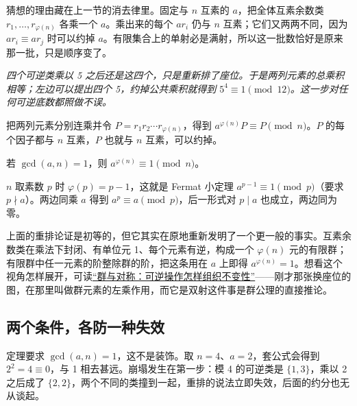 猜想的理由藏在上一节的消去律里。固定与 \(n\) 互素的 \(a\)，把全体互素余数类 \(r_1,\dots,r_{\varphi(n)}\) 各乘一个 \(a\)。乘出来的每个 \(ar_i\) 仍与 \(n\) 互素；它们又两两不同，因为 \(ar_i\equiv ar_j\) 时可以约掉 \(a\)。有限集合上的单射必是满射，所以这一批数恰好是原来那一批，只是顺序变了。

\begin{center}

\emph{四个可逆类乘以 5 之后还是这四个，只是重新排了座位。于是两列元素的总乘积相等；左边可以提出四个 5，约掉公共乘积就得到 \(5^{4}\equiv1\pmod{12}\)。这一步对任何可逆底数都照做不误。}
\end{center}

把两列元素分别连乘并令 \(P=r_1r_2\cdots r_{\varphi(n)}\)，得到 \(a^{\varphi(n)}P\equiv P\pmod n\)。\(P\) 的每个因子都与 \(n\) 互素，\(P\) 也就与 \(n\) 互素，可以约掉。

\begin{theorem}[Euler 定理]
若 \(\gcd(a,n)=1\)，则 \(a^{\varphi(n)}\equiv1\pmod n\)。
\end{theorem}

\(n\) 取素数 \(p\) 时 \(\varphi(p)=p-1\)，这就是 Fermat 小定理 \(a^{p-1}\equiv1\pmod p\)（要求 \(p\nmid a\)）。两边同乘 \(a\) 得到 \(a^{p}\equiv a\pmod p\)，后一形式对 \(p\mid a\) 也成立，两边同为零。

上面的重排论证是初等的，但它其实在原地重新发明了一个更一般的事实。互素余数类在乘法下封闭、有单位元 1、每个元素有逆，构成一个 \(\varphi(n)\) 元的有限群；有限群中任一元素的阶整除群的阶，把这条用在 \(a\) 上即得 \(a^{\varphi(n)}=1\)。想看这个视角怎样展开，可读\hyperref[ch:032]{``群与对称：可逆操作怎样组织不变性''}——刚才那张换座位的图，在那里叫做群元素的左乘作用，而它是双射这件事是群公理的直接推论。

\subsection{两个条件，各防一种失效}

定理要求 \(\gcd(a,n)=1\)，这不是装饰。取 \(n=4\)、\(a=2\)，套公式会得到 \(2^{2}=4\equiv0\)，与 1 相去甚远。崩塌发生在第一步：模 4 的可逆类是 \(\{1,3\}\)，乘以 2 之后成了 \(\{2,2\}\)，两个不同的类撞到一起，重排的说法立即失效，后面的约分也无从谈起。

